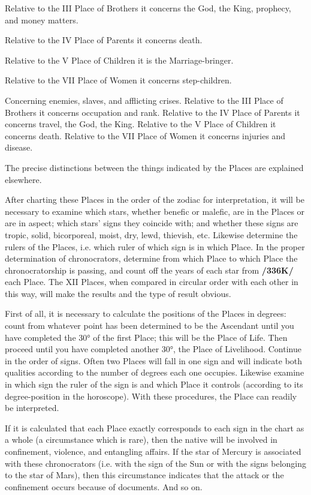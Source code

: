\begin{description}[labelindent=0em , labelwidth=1em, labelsep=1em, leftmargin =!]
	Relative to the III Place of Brothers it concerns the God, the King, prophecy, and money matters. 
	
	Relative to the IV Place of Parents it concerns death. 
	
	Relative to the V Place of Children it is the Marriage-bringer. 
	
	Relative to the VII Place of Women it concerns step-children.
	
\item[XII.]
	 Concerning enemies, slaves, and afflicting crises. Relative to the III Place of Brothers it concerns occupation and rank. Relative to the IV Place of Parents it concerns travel, the God, the King. Relative to the V Place of Children it concerns death. Relative to the VII Place of Women it concerns injuries and disease.
\end{description}


The precise distinctions between the things indicated by the Places are explained elsewhere. 

After charting these Places in the order of the zodiac for interpretation, it will be necessary to examine which stars, whether benefic or malefic, are in the Places or are in aspect; which stars’ signs they coincide with; and whether these signs are tropic, solid, bicorporeal, moist, dry, lewd, thievish, etc. Likewise determine
the rulers of the Places, i.e. which ruler of which sign is in which Place. In the proper determination of chronocrators, determine from which Place to which Place the chronocratorship is passing, and count off the years of each star from \textbf{/336K/} each Place. The XII Places, when compared in circular order with each other in this way, will make the results and the type of result obvious.

First of all, it is necessary to calculate the positions of the Places in degrees: count from whatever point has been determined to be the Ascendant until you have completed the 30° of the first Place; this will be the Place of Life. Then proceed until you have completed another 30°, the Place of Livelihood. Continue in the order of signs. Often two Places will fall in one sign and will indicate both qualities according to
the number of degrees each one occupies. Likewise examine in which sign the ruler of the sign is and which Place it controls (according to its degree-position in the horoscope). With these procedures, the
Place can readily be interpreted. 

If it is calculated that each Place exactly corresponds to each sign in the chart as a whole (a circumstance which is rare), then the native will be involved in confinement, violence, and entangling affairs. If the star of Mercury is associated with these chronocrators (i.e. with the sign of the Sun or with the signs belonging to the star of Mars), then this circumstance indicates that the attack or the confinement
occurs because of documents. And so on.

